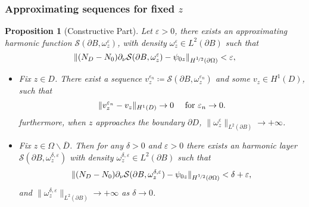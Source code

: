 \documentclass[10pt,xcolor={dvipsnames}]{beamer}
\newtheorem{proposition}[subsection]{Proposition}
\theoremstyle{plain}
\theoremstyle{plain}
\let\epsilon\varepsilon
\begin{document}
\begin{frame}
 \frametitle{Approximating sequences for fixed $z$}
\begin{proposition}[Constructive Part]
\label{prop:lsm-constructive}
Let $\epsilon > 0$, there exists an {\color{blue}approximating harmonic function} $\mathcal{S}(\partial B, \omega^\epsilon_z)$, with density $\omega^\epsilon_z\in L^2(\partial B)$  such that
\begin{equation}
 \|({N_D} - {N_0})\partial_\nu\mathcal{S}(\partial B, \omega^\epsilon_z) - \psi_{0z}\|_{H^{\nicefrac{1}{2}}(\partial\Omega)} < \epsilon,
\end{equation}
\begin{itemize}
 \item  Fix $z \in D$. 
  There exist a sequence 
 $v^{\epsilon_n}_z\coloneqq\mathcal{S}(\partial B, \omega^{\epsilon_n}_z)$ 
 and some
 $ v_z\in H^1(D)$, such that
  \begin{equation}
 \|v^{\epsilon_n}_z - v_z\|_{H^1(D)} \to 0\quad\textup{ for }\epsilon_n \to 0.
  \end{equation}
  furthermore, when $z$ approaches the boundary $\partial D$, $\|\omega^\epsilon_z\|_{L^2(\partial B)}\to + \infty$.
 \item Fix $z \in \Omega\backslash\overline{D}$. Then for any $\delta>0$ and $\epsilon > 0$ there exists an harmonic layer $\mathcal{S}(\partial B, \omega^{\delta, \epsilon}_z)$ with density $\omega^{\delta, \epsilon}_z\in L^2(\partial B)$ such that
\begin{equation}
 \|({N_D} - {N_0})\partial_\nu\mathcal{S}(\partial B, \omega^{\delta,\epsilon}_z) - \psi_{0z}\|_{H^{\nicefrac{1}{2}}(\partial\Omega)} < \delta + \epsilon,
\end{equation}
and $\|\omega^{\delta, \epsilon}_z\|_{L^2(\partial B)}\to + \infty$ as $\delta\to 0$.


\end{itemize}
\end{proposition}
\end{frame}
\end{document}
